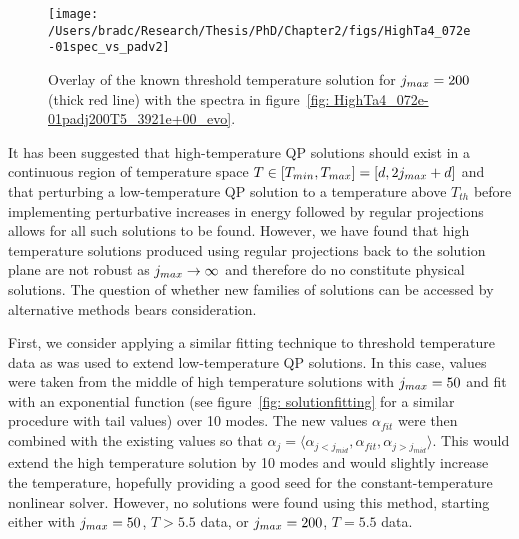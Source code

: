 \documentclass[../PhD.tex]{subfiles}
\begin{document}
\begin{figure}[ht]
	\centering
	\texttt{[image: /Users/bradc/Research/Thesis/PhD/Chapter2/figs/HighTa4\_072e-01spec\_vs\_padv2]}
	\caption[Comparison between a threshold temperature solution with $j_{max} = 200$ and the evolution of a $j_{max} = 100$ threshold temperature solution that has been padded by $100$ modes]{Overlay of the known threshold temperature solution for $j_{max} = 200$ (thick red line) with the spectra in figure~\ref{fig: HighTa4_072e-01padj200T5_3921e+00_evo}.}
	\label{fig: HighTa4_072e-01spec_vs_pad}
\end{figure}

It has been suggested that high-temperature QP solutions should exist in a continuous region of temperature space ${T \in [T_{min}, T_{max}] = [d, 2j_{max} + d]}$ and that perturbing a low-temperature QP solution to a temperature above $T_{th}$ before implementing perturbative increases in energy followed by regular projections allows for all such solutions to be found. However, we have found that high temperature solutions produced using regular projections back to the solution plane are not robust as $j_{max} \to \infty$ and therefore do no constitute physical solutions. The question of whether new families of solutions can be accessed by alternative methods bears consideration. 

First, we consider applying a similar fitting technique to threshold temperature data as was used to extend low-temperature QP solutions. In this case, values were taken from the middle of high temperature solutions with $j_{max} = 50$ and fit with an exponential function (see figure~\ref{fig: solutionfitting} for a similar procedure with tail values) over 10 modes. The new values $\alpha_{fit}$ were then combined with the existing values so that $\alpha_j = \langle \alpha_{j< j_{mid}}, \alpha_{fit}, \alpha_{j > j_{mid}} \rangle$. This would extend the high temperature solution by 10 modes and would slightly increase the temperature, hopefully providing a good seed for the constant-temperature nonlinear solver. However, no solutions were found using this method, starting either with $j_{max} = 50$, $T>5.5$ data, or $j_{max} = 200$, $T = 5.5$ data.
\end{document}
